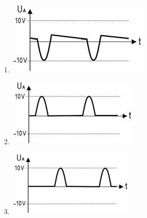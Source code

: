 \documentclass[8pt]{article}
\begin{document}
\begin{enumerate}
\begin{enumerate}[nolistsep,label=\Alph*]
\begin{enumerate}[nolistsep,label=\Alph*]
\begin{center}
\end{center}
\item
\begin{center}
	\begin{minipage}{\linewidth}
		\centering
		\includegraphics[scale=1.0]{pics/td431_d.jpg}
	\end{minipage}
\end{center}
\item
\begin{center}
	\begin{minipage}{\linewidth}
		\centering
		\includegraphics[scale=1.0]{pics/td431_e.jpg}
	\end{minipage}
\end{center}
\item
\begin{center}
	\begin{minipage}{\linewidth}
		\centering
		\includegraphics[scale=1.0]{pics/td431_f.jpg}
	\end{minipage}
\end{center}
\end{enumerate}


\end{enumerate}
\end{enumerate}
\end{document}
